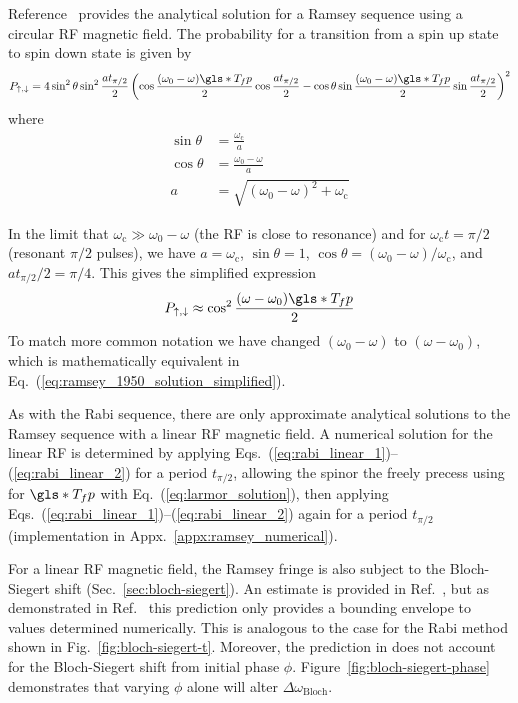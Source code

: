 Reference~\cite{ramsey_molecular_1950} provides the analytical solution for a Ramsey sequence using a circular RF magnetic field. The probability for a transition from a spin up state to spin down state is given by
%
\begin{gather}
    P_{\uparrow,\downarrow} = 4\sin^2\theta \sin^2\frac{at_{\pi/2}}{2}\left( \cos \frac{(\omega_0 - \omega)\gls*{T_fp}}{2}\cos\frac{at_{\pi/2}}{2}-\cos\theta \sin\frac{(\omega_0 - \omega)\gls*{T_fp}}{2}\sin\frac{at_{\pi/2}}{2} \right)^2 \label{eq:ramsey_1950_fringe_solution}
\end{gather}
%
where
%
\begin{align}
    \sin\theta &= \frac{\omega_\text{c}}{a} \\
    \cos\theta &= \frac{\omega_0 - \omega}{a} \\
    a &= \sqrt{(\omega_0-\omega)^2+\omega_\text{c}}
\end{align}

In the limit that $\omega_\text{c} \gg \omega_0 - \omega$ (the RF is close to resonance) and for $\omega_\text{c}t=\pi/2$ (resonant $\pi/2$ pulses), we have $a= \omega_\text{c}$, $\sin\theta= 1$, $\cos\theta=(\omega_0 - \omega)/\omega_\text{c}$, and $at_{\pi/2}/2=\pi/4$. This gives the simplified expression
%
\begin{gather}
    P_{\uparrow,\downarrow} \approx \cos^2\frac{(\omega - \omega_0)\gls*{T_fp}}{2} \label{eq:ramsey_1950_solution_simplified}
\end{gather}
%
To match more common notation we have changed $(\omega_0 - \omega)$ to $(\omega - \omega_0)$, which is mathematically equivalent in Eq.~(\ref{eq:ramsey_1950_solution_simplified}).

As with the Rabi sequence, there are only approximate analytical solutions to the Ramsey sequence with a linear RF magnetic field. A numerical solution for the linear RF is determined by applying Eqs.~(\ref{eq:rabi_linear_1})--(\ref{eq:rabi_linear_2}) for a period $t_{\pi/2}$, allowing the spinor the freely precess using for $\gls*{T_fp}$ with Eq.~(\ref{eq:larmor_solution}), then applying Eqs.~(\ref{eq:rabi_linear_1})--(\ref{eq:rabi_linear_2}) again for a period $t_{\pi/2}$ (implementation in Appx.~\ref{appx:ramsey_numerical}).

For a linear RF magnetic field, the Ramsey fringe is also subject to the Bloch-Siegert shift (Sec.~\ref{sec:bloch-siegert}). An estimate is provided in Ref.~\cite{code_bloch_siegert_1971}, but as demonstrated in Ref.~\cite{may_thesis} this prediction only provides a bounding envelope to values determined numerically. This is analogous to the case for the Rabi method shown in Fig.~\ref{fig:bloch-siegert-t}. Moreover, the prediction in \cite{code_bloch_siegert_1971} does not account for the Bloch-Siegert shift from initial phase $\phi$. Figure~\ref{fig:bloch-siegert-phase} demonstrates that varying $\phi$ alone will alter $\Delta\omega_\text{Bloch}$. 

